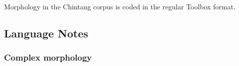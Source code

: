 \documentclass[a4paper, 11pt]{book}
\begin{document}
%

Morphology in the Chintang corpus is coded in the regular Toolbox format. 

\subsection{Language Notes}

\subsubsection*{Complex morphology}
\end{document}
